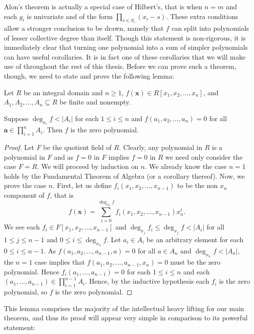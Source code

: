 	Alon's theorem is actually a special case of Hilbert's, that is when \(n = m\) and each \(g_{i}\) is univariate and of the form \(\prod_{s \in S_{i}} \left( x_{i} - s \right) 	\). These extra conditions allow a stronger conclusion to be drawn, namely that \(f\) can split into polynomials of lesser collective degree than itself. Though this statement is non-rigorous, it is immediately clear that turning one polynomial into a sum of simpler polynomials can have useful corollaries. It is in fact one of these corollaries that we will make use of throughout the rest of this thesis. Before we can prove such a theorem, though, we need to state and prove the following lemma:
	\begin{lemma}[]\cite{alon_1999}
			Let $R$ be an integral domain and \(n \ge 1\), $f\left( \textbf{x}
			\right) \in R[x_1, x_2, \ldots, x_{n}]$, and $A_1, A_2,
			\ldots, A_n \subseteq R$ be finite and nonempty.

			Suppose $\deg _{x_{i}} f < \left| A_i \right| $ for
			each $1\le i\le n$ and $f\left( a_1, a_2, \ldots, a_n
			\right) = 0$ for all \\ $ \textbf{a} \in \prod_{i= 1}^{n}
			A_i$. Then $f$ is the zero polynomial.  \end{lemma}
			\begin{proof}[Proof] Let  $F$ be the quotient field of
				$R$. Clearly, any polynomial in $R$ is a
				polynomial in $F$ and as $f=0$ in $F$ implies
				$f=0$ in $R$ we need only consider the case
				$F=R$. We will proceed by induction on \(n\). We already know the case \(n=1\) holds by the Fundamental Theorem of Algebra (or a corollary thereof). Now, we prove the case $n$.
				First, let us define  $f_i \left( x_1, x_2,
				\ldots, x_{n-1} \right) $ to be the non \(x_{n}\) component of \(f\), that is \[f\left( \textbf{x} \right)  =
				\sum_{i=0}^{\deg _{x_{n}} f} f_i \left( x_1,
			x_2, \ldots, x_{n-1} \right)  x_n ^{i}.\]  We
			see each $f_i \in F[x_1, x_2, \ldots, x_{n-1}]$
				and $\deg_{x_{j}} f_i \le \deg _{x_{j}} f <
				\left| A_i \right| $ for all $1 \le j \le n-1$
				and $0 \le i \le \deg _{x_{n}} f$. Let $a_i \in
				A_i$ be an arbitrary element for each \(0 \le i \le n - 1\).
				As $f\left( a_1, a_2, \ldots, a_{n-1}, a
				\right) = 0$ for all $a \in A_n$ and $\deg
				_{x_{n}} f < \left| A_n \right| $, the $n=1$
				case implies that $f\left( a_1, a_2, \ldots,
				a_{n-1}, x_{n} \right) = 0$ must be the zero
				polynomial. Hence $f_i \left( a_1, \ldots,
				a_{n-1} \right) =0$ for each $1\le i \le n$ and each $
				\left( a_1, \ldots, a_{n-1} \right)  \in \prod_{i= 1}^{n-1} A_i$. Hence, by
			the inductive hypothesis each $f_i$ is the zero polynomial, so $f$ is the zero
	polynomial.  \end{proof} This lemma comprises the majority of the
	intellectual heavy lifting for our main theorem, and thus its proof
	will appear very simple in comparison to its powerful statement:

